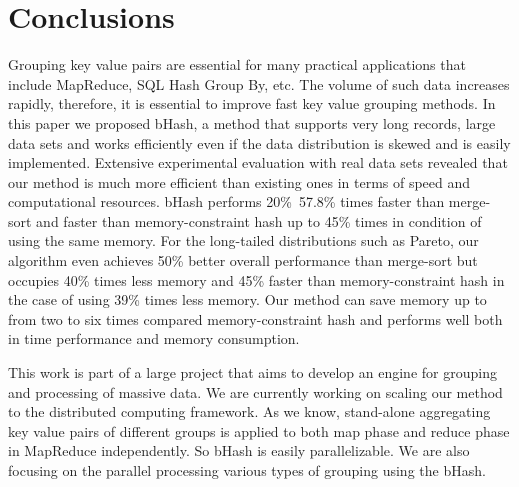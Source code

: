\section{Conclusions}

Grouping key value pairs are essential for many practical applications that include MapReduce, SQL Hash Group By, etc. The volume of such data increases rapidly, therefore, it is essential to improve fast key value grouping methods. In this paper we proposed bHash, a method that supports very long records, large data sets and works efficiently even if the data distribution is skewed  and is easily implemented. Extensive experimental evaluation with real data sets revealed that our method is much more efficient than existing ones in terms of speed and computational resources. bHash performs 20\%~57.8\% times faster than merge-sort and faster than memory-constraint hash up to 45\% times in condition of using the same memory. For the long-tailed distributions such as Pareto, our algorithm even achieves 50\% better overall performance than merge-sort but occupies 40\% times less memory and 45\% faster than memory-constraint hash in the case of using 39\% times less memory. Our method can save memory up to from two to six times compared memory-constraint hash and performs well both in time performance and memory consumption.

This work is part of a large project that aims to develop an engine for grouping and processing of massive data. We are currently working on scaling our method to the distributed computing framework. As we know, stand-alone aggregating key value pairs of different groups is applied to both map phase and reduce phase in MapReduce independently. So bHash is easily parallelizable. We are also focusing on the parallel processing various types of grouping using the bHash.


